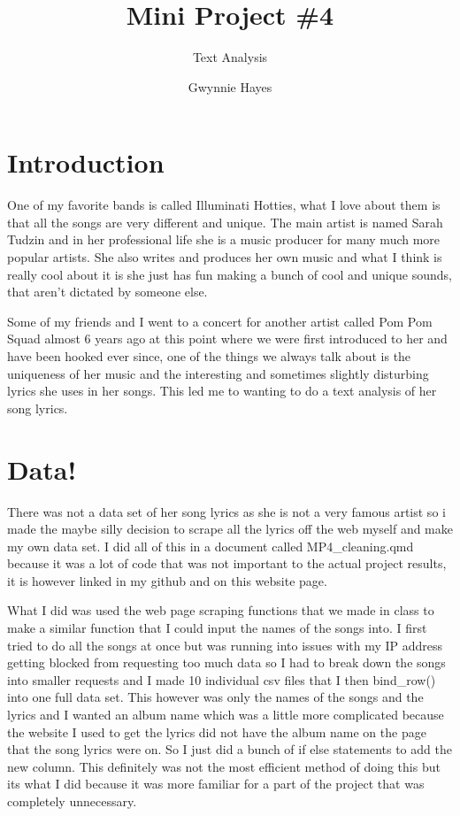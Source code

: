 \documentclass[
  letterpaper,
  DIV=11,
  numbers=noendperiod]{scrartcl}
\title{Mini Project \#4}
\subtitle{Text Analysis}
\author{Gwynnie Hayes}
\date{}
\begin{document}
\maketitle


\section{Introduction}\label{introduction}

One of my favorite bands is called Illuminati Hotties, what I love about
them is that all the songs are very different and unique. The main
artist is named Sarah Tudzin and in her professional life she is a music
producer for many much more popular artists. She also writes and
produces her own music and what I think is really cool about it is she
just has fun making a bunch of cool and unique sounds, that aren't
dictated by someone else.

Some of my friends and I went to a concert for another artist called Pom
Pom Squad almost 6 years ago at this point where we were first
introduced to her and have been hooked ever since, one of the things we
always talk about is the uniqueness of her music and the interesting and
sometimes slightly disturbing lyrics she uses in her songs. This led me
to wanting to do a text analysis of her song lyrics.

\section{Data!}\label{data}

There was not a data set of her song lyrics as she is not a very famous
artist so i made the maybe silly decision to scrape all the lyrics off
the web myself and make my own data set. I did all of this in a document
called MP4\_cleaning.qmd because it was a lot of code that was not
important to the actual project results, it is however linked in my
github and on this website page.

What I did was used the web page scraping functions that we made in
class to make a similar function that I could input the names of the
songs into. I first tried to do all the songs at once but was running
into issues with my IP address getting blocked from requesting too much
data so I had to break down the songs into smaller requests and I made
10 individual csv files that I then bind\_row() into one full data set.
This however was only the names of the songs and the lyrics and I wanted
an album name which was a little more complicated because the website I
used to get the lyrics did not have the album name on the page that the
song lyrics were on. So I just did a bunch of if else statements to add
the new column. This definitely was not the most efficient method of
doing this but its what I did because it was more familiar for a part of
the project that was completely unnecessary.
\end{document}

